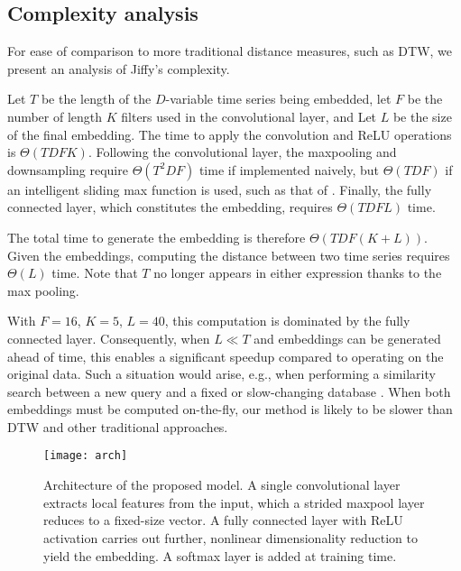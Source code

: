 

\subsection{Complexity analysis}

For ease of comparison to more traditional distance measures, such as DTW, we present an analysis of Jiffy's complexity.

Let $T$ be the length of the $D$-variable time series being embedded, let $F$ be the number of length $K$ filters used in the convolutional layer, and Let $L$ be the size of the final embedding.
The time to apply the convolution and ReLU operations is $\Theta(TDFK)$. Following the convolutional layer, the maxpooling and downsampling require $\Theta(T^2DF)$ time if implemented naively, but $\Theta(TDF)$ if an intelligent sliding max function is used, such as that of \citep{lemireMax}. Finally, the fully connected layer, which constitutes the embedding, requires $\Theta(TDFL)$ time.

The total time to generate the embedding is therefore $\Theta(TDF(K + L))$. Given the embeddings, computing the distance between two time series requires $\Theta(L)$ time. Note that $T$ no longer appears in either expression thanks to the max pooling.

With $F = 16$, $K = 5$, $L = 40$, this computation is dominated by the fully connected layer. Consequently, when $L \ll T$ and embeddings can be generated ahead of time, this enables a significant speedup compared to operating on the original data. Such a situation would arise, e.g., when performing a similarity search between a new query and a fixed or slow-changing database \citep{bolt}. When both embeddings must be computed on-the-fly, our method is likely to be slower than DTW and other traditional approaches. %

\begin{figure*}[h]
\begin{center}
\texttt{[image: arch]}
\caption{Architecture of the proposed model. A single convolutional layer extracts local features from the input, which a strided maxpool layer reduces to a fixed-size vector. A fully connected layer with ReLU activation carries out further, nonlinear dimensionality reduction to yield the embedding. A softmax layer is added at training time.}
\label{fig:arch}
\end{center}
\end{figure*}

